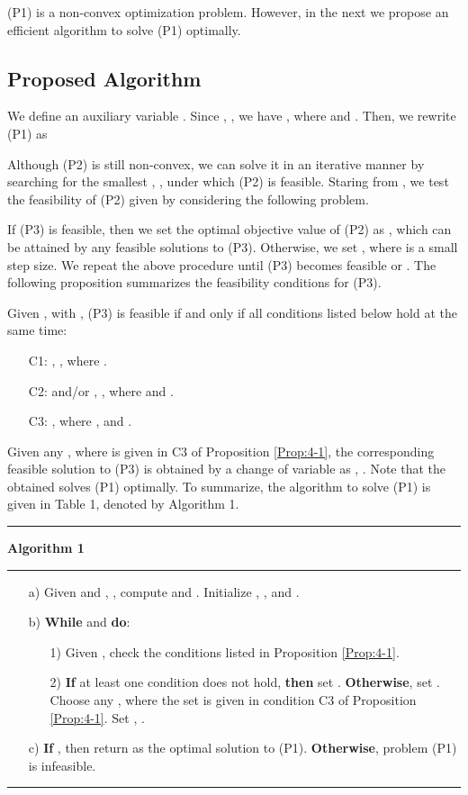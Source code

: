 \documentclass[onecolumn, a4size, 11pt]{IEEEtran}
\begin{document}
(P1) is a non-convex optimization problem. 
However,  in the next  we propose an efficient algorithm to solve  (P1) optimally.
\subsection{Proposed Algorithm}
We define an auxiliary variable . 
Since , , we   have , where  and .
Then, we rewrite (P1) as 
 

Although (P2) is still  non-convex, we can solve it in an iterative manner by searching for the smallest  , ,  under which  (P2) is  feasible.
Staring from ,  we test the feasibility  of (P2) given  by considering the  following problem.
 
If (P3) is feasible,  then we set the optimal objective value of (P2) as ,  which can be attained by any  feasible solutions  to  (P3). 
Otherwise,   we set   , where  is a small step size. We  repeat the above procedure until  (P3)  becomes feasible or   . 
The following proposition summarizes the feasibility conditions for  (P3).
\begin{proposition} \label{Prop:4-1}
Given , with ,   (P3) is  feasible  if and only if all conditions listed below hold at the same time: 
\begin{itemize}
\item[C1:], , where .
\item[C2:] and/or  , , where  and .
\item[C3:], where  , and .
\end{itemize}
\end{proposition}


Given any , where  is given in C3 of Proposition \ref{Prop:4-1},  the corresponding feasible solution to (P3) is obtained by a change of variable as , . Note that the obtained  solves (P1) optimally.
To summarize, the  algorithm  to solve (P1) is given  in Table 1, denoted by Algorithm 1.
\begin{table}[t!]
\begin{center} 
\caption{Algorithm  for optimally solving (P1).} \scriptsize{
 \hrule
\textbf{Algorithm 1}
\hrule 
\begin{itemize}
\item[a)] Given  and  , , compute  and . Initialize ,  , and . 
\item[b)] {\bf While}  and  {\bf do}:
\begin{itemize}
\item[1)] Given , check the conditions listed in Proposition \ref{Prop:4-1}. 
\item[2)] {\bf If} at least one condition does not hold, {\bf then}  set .  {\bf Otherwise}, set .  Choose  any , where the set  is given in condition C3 of Proposition \ref{Prop:4-1}.  Set , .
\end{itemize}
\item[c)] {\bf If} , then return  as the optimal solution to (P1). {\bf Otherwise},   problem (P1) is infeasible.
\end{itemize}
\hrule \label{algorithm:1} }
\end{center}
\end{table}
\end{document}
